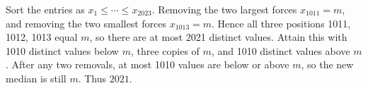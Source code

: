 Sort the entries as $x_1\le\cdots\le x_{2023}$. Removing the two largest forces $x_{1011}=m$, and removing the two smallest forces $x_{1013}=m$. Hence all three positions 1011, 1012, 1013 equal $m$, so there are at most 2021 distinct values. Attain this with 1010 distinct values below $m$, three copies of $m$, and 1010 distinct values above $m$. After any two removals, at most 1010 values are below or above $m$, so the new median is still $m$. Thus $\boxed{2021}$.
